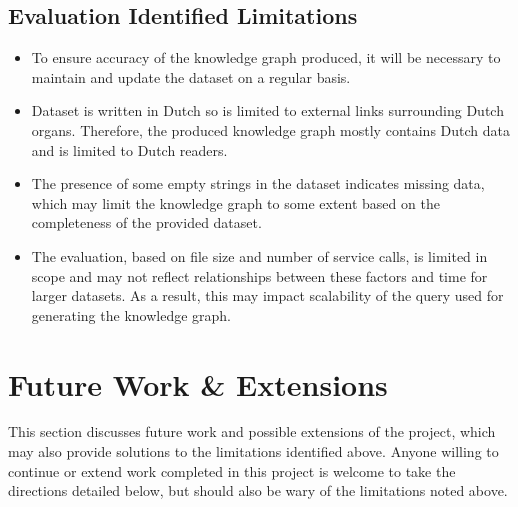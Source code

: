\subsection{Evaluation Identified Limitations}
\begin{itemize}
    \item To ensure accuracy of the knowledge graph produced, it will be necessary to maintain and update the dataset on a regular basis.
    \item Dataset is written in Dutch so is limited to external links surrounding Dutch organs. Therefore, the produced knowledge graph mostly contains Dutch data and is limited to Dutch readers. 
    \item The presence of some empty strings in the dataset indicates missing data, which may limit the knowledge graph to some extent based on the completeness of the provided dataset.
    \item  The evaluation, based on file size and number of service calls, is limited in scope and may not reflect relationships between these factors and time for larger datasets. As a result, this may impact scalability of the query used for generating the knowledge graph.
\end{itemize}

\section{Future Work \& Extensions}
\hspace{0.5cm} This section discusses future work and possible extensions of the project, which may also provide solutions to the limitations identified above. Anyone willing to continue or extend work completed in this project is welcome to take the directions detailed below, but should also be wary of the limitations noted above. 

